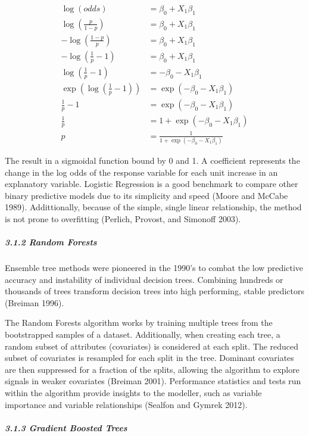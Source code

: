 \documentclass[]{elsarticle} %
\begin{document}
\[
\begin{aligned}
\log(odds) &= \beta_0 + X_1\beta_1 \\
\log\left(\frac{p}{1-p}\right) &= \beta_0 + X_1\beta_1 \\
-\log\left(\frac{1-p}{p}\right) &= \beta_0 + X_1\beta_1 \\
-\log\left(\frac{1}{p} - 1\right) &= \beta_0 + X_1\beta_1 \\
\log\left(\frac{1}{p} - 1\right) &= -\beta_0 - X_1\beta_1 \\
\exp\left(\log\left(\frac{1}{p} - 1\right)\right) &= \exp(-\beta_0 - X_1\beta_1) \\
\frac{1}{p} - 1 &= \exp(-\beta_0 - X_1\beta_1) \\
\frac{1}{p} &= 1 + \exp(-\beta_0 - X_1\beta_1) \\
p &= \frac{1}{1 + \exp(-\beta_0 - X_1\beta_1)}
\end{aligned}
\]

The result in a sigmoidal function bound by 0 and 1. A coefficient
represents the change in the log odds of the response variable for each
unit increase in an explanatory variable. Logistic Regression is a good
benchmark to compare other binary predictive models due to its
simplicity and speed (Moore and McCabe 1989). Addittionally, because of
the simple, single linear relationship, the method is not prone to
overfitting (Perlich, Provost, and Simonoff 2003).

\subparagraph{3.1.2 Random Forests}\label{random-forests}

Ensemble tree methods were pioneered in the 1990's to combat the low
predictive accuracy and instability of individual decision trees.
Combining hundreds or thousands of trees transform decision trees into
high performing, stable predictors (Breiman 1996).

The Random Forests algorithm works by training multiple trees from the
bootstrapped samples of a dataset. Additionally, when creating each
tree, a random subset of attributes (covariates) is considered at each
split. The reduced subset of covariates is resampled for each split in
the tree. Dominant covariates are then suppressed for a fraction of the
splits, allowing the algorithm to explore signals in weaker covariates
(Breiman 2001). Performance statistics and tests run within the
algorithm provide insights to the modeller, such as variable importance
and variable relationships (Sealfon and Gymrek 2012).

\subparagraph{3.1.3 Gradient Boosted
Trees}\label{gradient-boosted-trees}
\end{document}

